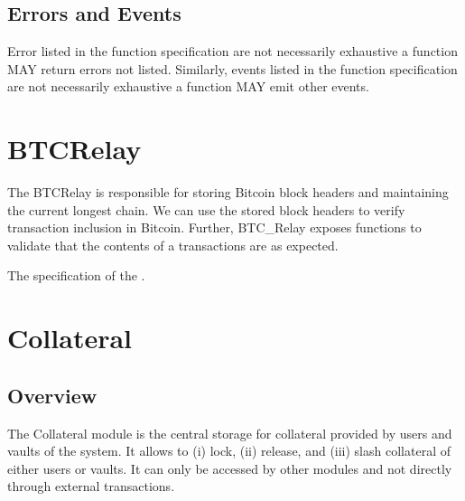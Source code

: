 \documentclass[a4paper,10pt,english]{sphinxmanual}
\begin{document}
\section{Errors and Events}
\label{\detokenize{spec/introduction:errors-and-events}}
Error listed in the function specification are not necessarily exhaustive \sphinxhyphen{} a function MAY return errors not listed. Similarly, events listed in the function specification are not necessarily exhaustive \sphinxhyphen{} a function MAY emit other events.


\chapter{BTC\sphinxhyphen{}Relay}
\label{\detokenize{spec/btc-relay:btc-relay}}\label{\detokenize{spec/btc-relay:id1}}\label{\detokenize{spec/btc-relay::doc}}
The BTC\sphinxhyphen{}Relay is responsible for storing Bitcoin block headers and maintaining the current longest chain.
We can use the stored block headers to verify transaction inclusion in Bitcoin.
Further, BTC\_Relay exposes functions to validate that the contents of a transactions are as expected.

The specification of the .


\chapter{Collateral}
\label{\detokenize{spec/collateral:collateral}}\label{\detokenize{spec/collateral:collateral-module}}\label{\detokenize{spec/collateral::doc}}

\section{Overview}
\label{\detokenize{spec/collateral:overview}}
The Collateral module is the central storage for collateral provided by users and vaults of the system.
It allows to (i) lock, (ii) release, and (iii) slash collateral of either users or vaults.
It can only be accessed by other modules and not directly through external transactions.
\end{document}
